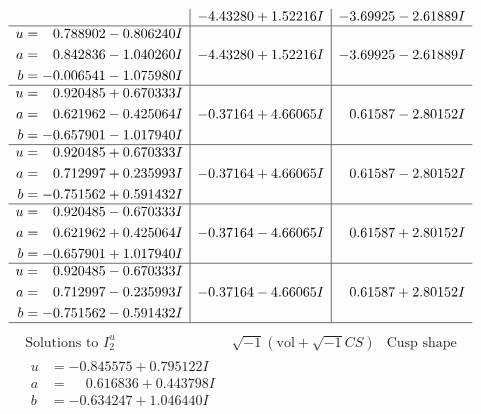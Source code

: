 \documentclass[1p]{elsarticle_modified}
\theoremstyle{definition}
\newcommand{\I}{\sqrt{-1}}
\begin{document}
$$\begin{array}{c|c|c}
 & -4.43280 + 1.52216 I & -3.69925 - 2.61889 I \\ \hline\begin{aligned}
u &= \phantom{-}0.788902 - 0.806240 I \\
a &= \phantom{-}0.842836 - 1.040260 I \\
b &= -0.006541 - 1.075980 I\end{aligned}
 & -4.43280 + 1.52216 I & -3.69925 - 2.61889 I \\ \hline\begin{aligned}
u &= \phantom{-}0.920485 + 0.670333 I \\
a &= \phantom{-}0.621962 - 0.425064 I \\
b &= -0.657901 - 1.017940 I\end{aligned}
 & -0.37164 + 4.66065 I & \phantom{-}0.61587 - 2.80152 I \\ \hline\begin{aligned}
u &= \phantom{-}0.920485 + 0.670333 I \\
a &= \phantom{-}0.712997 + 0.235993 I \\
b &= -0.751562 + 0.591432 I\end{aligned}
 & -0.37164 + 4.66065 I & \phantom{-}0.61587 - 2.80152 I \\ \hline\begin{aligned}
u &= \phantom{-}0.920485 - 0.670333 I \\
a &= \phantom{-}0.621962 + 0.425064 I \\
b &= -0.657901 + 1.017940 I\end{aligned}
 & -0.37164 - 4.66065 I & \phantom{-}0.61587 + 2.80152 I \\ \hline\begin{aligned}
u &= \phantom{-}0.920485 - 0.670333 I \\
a &= \phantom{-}0.712997 - 0.235993 I \\
b &= -0.751562 - 0.591432 I\end{aligned}
 & -0.37164 - 4.66065 I & \phantom{-}0.61587 + 2.80152 I\\
 \hline 
 \end{array}$$\newpage$$\begin{array}{c|c|c}  
\text{Solutions to }I^u_{2}& \I (\text{vol} + \sqrt{-1}CS) & \text{Cusp shape}\\
 \hline 
\begin{aligned}
u &= -0.845575 + 0.795122 I \\
a &= \phantom{-}0.616836 + 0.443798 I \\
b &= -0.634247 + 1.046440 I\end{aligned}

\end{array}$$
\end{document}
